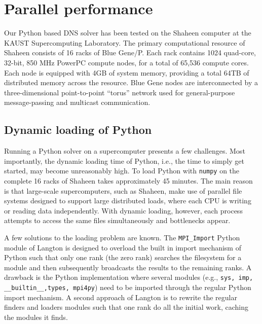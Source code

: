 \documentclass[11pt, oneside]{article}
\newcommand{\inpyth}{\lstinline[keywordstyle={}, basicstyle=\ttfamily]} %[]%
\begin{document}
\section{Parallel performance}
Our Python based DNS solver has been tested on the Shaheen computer at the KAUST Supercomputing Laboratory. The primary computational resource of Shaheen consists of 16 racks of Blue Gene/P. Each rack contains 1024 quad-core, 32-bit, 850 MHz PowerPC compute nodes, for a total of 65,536 compute cores. Each node is equipped with 4GB of system memory, providing a total 64TB of distributed memory across the resource. Blue Gene nodes are interconnected by a three-dimensional point-to-point ``torus'' network used for general-purpose message-passing and multicast communication.

\subsection{Dynamic loading of Python}
Running a Python solver on a supercomputer presents a few challenges. Most importantly, the dynamic loading time of Python, i.e., the time to simply get started, may become unreasonably high. To load Python with \texttt{numpy} on the complete 16 racks of Shaheen takes approximately 45 minutes. The main reason is that large-scale supercomputers, such as Shaheen, make use of parallel file systems designed to support large distributed loads, where each CPU is writing or reading data independently. With dynamic loading, however, each process attempts to access the same files simultaneously and bottlenecks appear.

A few solutions to the loading problem are known. The \inpyth{MPI_Import} Python module of Langton \cite{mpi_import} is designed to overload the built in import mechanism of Python such that only one rank (the zero rank) searches the filesystem for a module and then subsequently broadcasts the results to the remaining ranks. A drawback is the Python implementation where several modules (e.g., \inpyth{sys, imp, __builtin__,types, mpi4py}) need to be imported through the regular Python import mechanism. A second approach of Langton is to rewrite the regular finders and loaders modules such that one rank do all the initial work, caching the modules it finds.
\end{document}
